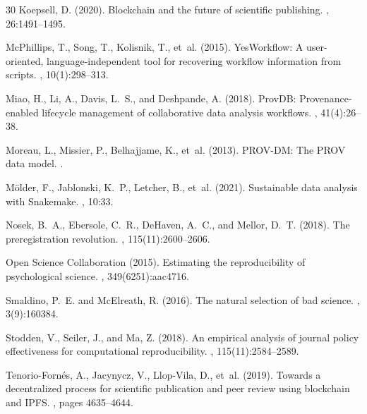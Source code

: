 \begin{thebibliography}{30}
Koepsell, D. (2020).
\newblock Blockchain and the future of scientific publishing.
, 26:1491--1495.

McPhillips, T., Song, T., Kolisnik, T., et~al. (2015).
\newblock YesWorkflow: A user-oriented, language-independent tool for recovering workflow information from scripts.
, 10(1):298--313.

Miao, H., Li, A., Davis, L.~S., and Deshpande, A. (2018).
\newblock ProvDB: Provenance-enabled lifecycle management of collaborative data analysis workflows.
, 41(4):26--38.

Moreau, L., Missier, P., Belhajjame, K., et~al. (2013).
\newblock PROV-DM: The PROV data model.
.

M\"{o}lder, F., Jablonski, K.~P., Letcher, B., et~al. (2021).
\newblock Sustainable data analysis with Snakemake.
, 10:33.

Nosek, B.~A., Ebersole, C.~R., DeHaven, A.~C., and Mellor, D.~T. (2018).
\newblock The preregistration revolution.
, 115(11):2600--2606.

Open Science Collaboration (2015).
\newblock Estimating the reproducibility of psychological science.
, 349(6251):aac4716.

Smaldino, P.~E. and McElreath, R. (2016).
\newblock The natural selection of bad science.
, 3(9):160384.

Stodden, V., Seiler, J., and Ma, Z. (2018).
\newblock An empirical analysis of journal policy effectiveness for computational reproducibility.
, 115(11):2584--2589.

Tenorio-Forn\'{e}s, A., Jacynycz, V., Llop-Vila, D., et~al. (2019).
\newblock Towards a decentralized process for scientific publication and peer review using blockchain and IPFS.
, pages 4635--4644.


\end{thebibliography}
